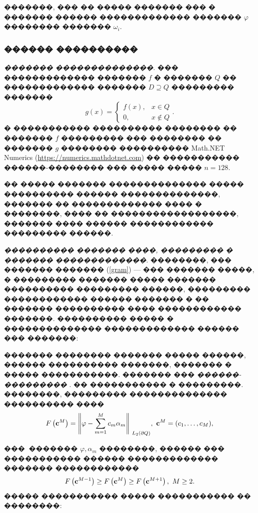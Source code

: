 \documentclass[a4paper]{article}
\begin{document}
�������, ��� �� ����� ������� ��� � ������� ������ ������������� ������� $\varphi$ �������� ������� $\omega_i$.

\subsubsection{������ ����������}
{\it������� ��������������}. ��� ������������� ������� $f$ � ������� $Q$ �� ������������� ������� $D \supseteq Q$ ��������� �������
\begin{equation*}
  g(x)=
  \begin{cases}
    f(x), & x \in Q      \\
    0,    & x \not \in Q
  \end{cases}.
\end{equation*}
� ����������� ���������� �������� �� ������� $f$ ��������� ��� �������� �� ������� $g$ �������� ���������� Math.NET Numerics (\url{https://numerics.mathdotnet.com})
�� ����������� ������-�������� ��� ����� ����� $n=128$.

�� ����� ������� �������������� ����� ���������� ������ ��������������, �������  �� ������������� ���� � ��������, ���� �� ������������������, ������� ���� ������ ������������ ��������� ������.

{\it���������� ������� ����, ��������� � ������� �������������}. ��������, ��� ������� ������� (\ref{gram}) --- ��� ������� �����, � ��������� ������� ����� ������� ���������� ��������� ������, ��������� ������������ ������ ������� � �� ������� ���������� ���� ������������ �������.
���������� ����� � �������������� ������������� ������ ��� �������:

������� �������� ������� ����� ������, ������ ���������� �������, ������� � ����� �����������.
������� ��� {\it ������-���������} .
�� ����������� � ���������. ��������, ��������� �������������� ���������� ����
\begin{equation}
  F\left({\bf c}^M\right)={\left\|\varphi -\sum^M_{m=1}{c_m}{\alpha }_m\right\|}_{{\ L}_2\left(\partial Q\right)},\ {\bf c}^M=(c_1,\dots,c_M),
\end{equation}

��� $\ \text{������� } \varphi, \alpha_m \text{ ��������}$,
������ ��� ����������� ������ ������������� ������� ������������
\begin{equation}F\left({\bf c}^{M-1}\right)\ge F\left({\bf c}^M\right)\ge F\left({\bf c}^{M+1}\right),\ M\ge 2.
\end{equation}
����� ����������� ����� ����������� �� ��������:
\end{document}
